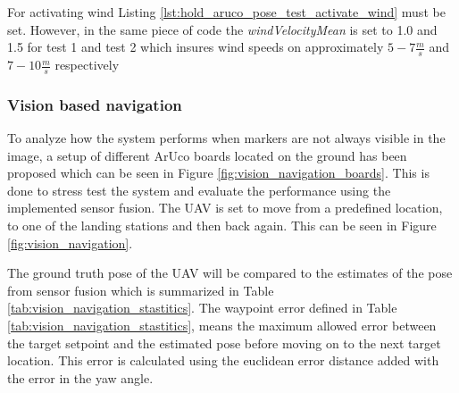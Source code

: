 \documentclass[../Head/report.tex]{subfiles}
\begin{document}
For activating wind Listing \ref{lst:hold_aruco_pose_test_activate_wind} must be set. However, in the same piece of code the \textit{windVelocityMean} is set to 1.0 and 1.5 for test 1 and test 2 which insures wind speeds on approximately $5-7 \frac{m}{s}$ and $7-10 \frac{m}{s}$ respectively 

\subsubsection{Vision based navigation}
\label{sec:vision_based_navigation}

To analyze how the system performs when markers are not always visible in the image, a setup of different ArUco boards located on the ground has been proposed which can be seen in Figure \ref{fig:vision_navigation_boards}. This is done to stress test the system and evaluate the performance using the implemented sensor fusion. The UAV is set to move from a predefined location, to one of the landing stations and then back again. This can be seen in Figure \ref{fig:vision_navigation}. 

The ground truth pose of the UAV will be compared to the estimates of the pose from sensor fusion which is summarized in Table \ref{tab:vision_navigation_stastitics}. The waypoint error defined in Table \ref{tab:vision_navigation_stastitics}, means the maximum allowed error between the target setpoint and the estimated pose before moving on to the next target location. This error is calculated using the euclidean error distance added with the error in the yaw angle.   
\end{document}
